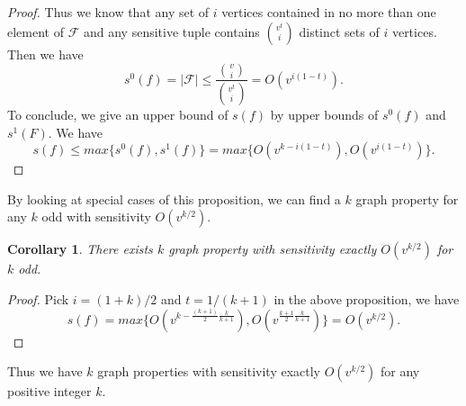 \documentclass[psamsfonts]{amsart}
\newtheorem{cor}[theorem]{Corollary}
\theoremstyle{definition}
\theoremstyle{remark}
\numberwithin{equation}{section}
\begin{document}
\begin{proof}
		\indent Thus we know that any set of $i$ vertices contained in no more than one element of $\mathcal{F}$ and any sensitive tuple contains $v^t \choose{i}$ distinct sets of $i$ vertices. Then we have
		\begin{equation}
			s^0(f) = |\mathcal{F}| \leq \frac{{v \choose{i}}}{{v^t \choose{i}}} = O(v^{i(1-t)}). \nonumber
		\end{equation}
		To conclude, we give an upper bound of $s(f)$ by upper bounds of $s^0(f)$ and $s^1(F)$. We have
		\begin{equation}
			s(f) \leq max\{s^0(f),s^1(f)\} = max\{ O(v^{k-i(1-t)}), O(v^{i(1-t)})\}. \nonumber
		\end{equation}
	\end{proof}
	
	By looking at special cases of this proposition, we can find a $k$ graph property for any $k$ odd with sensitivity $O(v^{k/2})$.
	\begin{cor}
		There exists $k$ graph property with sensitivity exactly $O(v^{k/2})$ for $k$ odd.
	\end{cor}
	\begin{proof}
		Pick $i=(1+k)/2$ and $t = 1/(k+1)$ in the above proposition, we have
		\begin{equation}
			s(f) = max\{O(v^{k- \frac{(k+1)}{2}  \frac{k}{k+1}}), O(v^{\frac{k+1}{2}  \frac{k}{k+1}})\} = O(v^{k/2}). \nonumber
		\end{equation}
	\end{proof}
	Thus we have $k$ graph properties with sensitivity exactly $O(v^{k/2})$ for any positive integer $k$.
	
\end{document}

